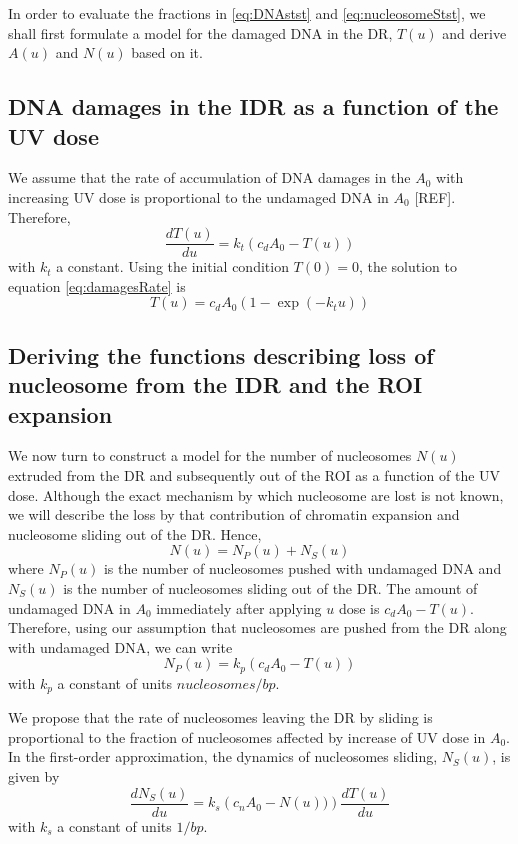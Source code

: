 \documentclass[12pt]{article}
\begin{document}
	In order to evaluate the fractions in \eqref{eq:DNAstst} and \eqref{eq:nucleosomeStst}, we shall first formulate a model for the damaged DNA in the DR, $T(u)$ and derive $A(u)$ and $N(u)$ based on it.
	
	\subsection{DNA damages in the IDR as a function of the UV dose}\label{subsection:AccumulationOfDNADamagesInTheIDR}
	We assume that the rate of accumulation of DNA damages in the
	$A_0$ with increasing UV dose is proportional to the undamaged DNA in $A_0$ [REF]. Therefore,	
	\begin{equation}\label{eq:damagesRate}
	\frac{dT(u)}{du} = k_t(c_dA_0 - T(u))
	\end{equation}	
	with $k_t$ a constant. Using the initial condition $T(0) = 0$, the solution to equation \eqref{eq:damagesRate} is
	\begin{equation*}\label{eq:damagesIDR}
	T(u) = c_dA_0(1-\exp(−k_tu))
	\end{equation*}
	
	\subsection{Deriving the functions describing loss of nucleosome from the IDR and the ROI expansion}
	We now turn to construct a model for the number of nucleosomes $N(u)$
	extruded from the DR and subsequently out of the ROI as a function of the UV dose. Although the exact mechanism by which nucleosome are lost is not known, we will describe the loss by that contribution of chromatin expansion and nucleosome sliding out of the DR. Hence,
	\begin{equation}\label{eq:nucleosomesAsSum}
	N(u)=N_P(u)+N_S(u)
	\end{equation}
	where $N_P(u)$ is the number of nucleosomes pushed with undamaged DNA and $N_S(u)$ is the number of nucleosomes sliding out of the DR.
	The amount of undamaged DNA in $A_0$ immediately after applying $u$ dose is $c_dA_0-T(u)$. Therefore, using our assumption that nucleosomes are pushed from the DR along with undamaged DNA, we can write 
	\begin{equation}\label{eq:nucleosomePush}
	N_P(u) = k_p(c_dA_0-T(u))
	\end{equation}	
	with $k_p$ a constant of units $nucleosomes/bp $. 
	
	We propose that the rate of nucleosomes leaving the DR by sliding is proportional to the fraction of nucleosomes affected by increase of UV dose in $A_0$. In the first-order approximation, the dynamics of nucleosomes sliding, $N_S(u)$, is given by
	\begin{equation}\label{eq:nucleosomeSlideRate}
	\frac{dN_S(u)}{du} = k_s\left( c_nA_0-N(u))\right)\frac{dT(u)}{du}	
	\end{equation}
	with $k_s$ a constant of units $1/bp$. 
	
\end{document}
